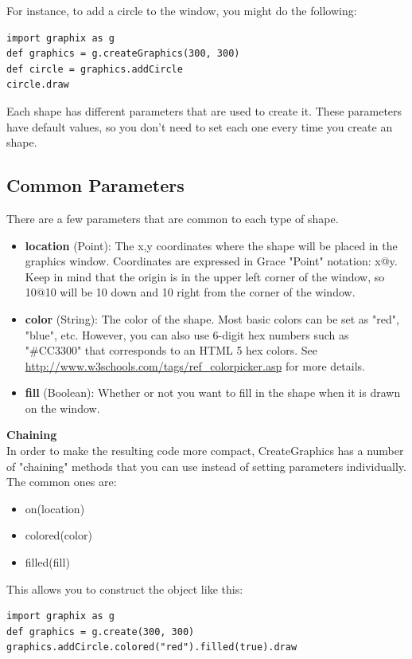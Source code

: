 \documentclass{article}
\begin{document}
For instance, to add a circle to the window, you might do the following:
\begin{lstlisting}
import graphix as g
def graphics = g.createGraphics(300, 300)
def circle = graphics.addCircle
circle.draw
\end{lstlisting}
Each shape has different parameters that are used to create it. These parameters have default values, so you don't need to set each
one every time you create an shape.

\subsection{Common Parameters}
There are a few parameters that are common to each type of shape.

\begin{itemize}
\item \textbf{location} (Point): The x,y coordinates where the shape will be placed in the graphics window. Coordinates are expressed in Grace "Point" notation: x@y. Keep in mind that the origin is in the upper left corner of the window, so 10@10 will be 10 down and 10 right from the corner of the window.
\item \textbf{color} (String): The color of the shape. Most basic colors can be set as "red", "blue", etc. However, you can also use 6-digit hex numbers 
such as "\#CC3300" that corresponds to an HTML 5 hex colors. See \url{http://www.w3schools.com/tags/ref_colorpicker.asp} for more details.
\item \textbf{fill} (Boolean): Whether or not you want to fill in the shape when it is drawn on the window.
\end{itemize}

\textbf{Chaining} \\
In order to make the resulting code more compact, CreateGraphics has a number of "chaining"
methods that you can use instead of setting parameters individually. The common ones are:
\begin{itemize}
\item on(location)
\item colored(color)
\item filled(fill)
\end{itemize}

This allows you to construct the object like this:

\begin{lstlisting}
import graphix as g
def graphics = g.create(300, 300)
graphics.addCircle.colored("red").filled(true).draw
\end{lstlisting}
\end{document}
